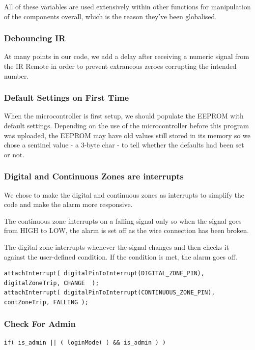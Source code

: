 \documentclass[a4paper,11pt]{article}
\theoremstyle{mytheor}
\begin{document}
All of these variables are used extensively within other functions for manipulation of the components overall, which is the reason they've been globalised.

\subsubsection{Debouncing IR}

At many points in our code, we add a delay after receiving a numeric signal from the IR Remote in order to prevent extraneous zeroes corrupting the intended number.

\subsubsection{Default Settings on First Time}

When the microcontroller is first setup, we should populate the EEPROM with default settings. Depending on the use of the microcontroller before this program was uploaded, the EEPROM may have old values still stored in its memory so we chose a sentinel value - a 3-byte char - to tell whether the defaults had been set or not. 

\subsubsection{Digital and Continuous Zones are interrupts}

We chose to make the digital and continuous zones as interrupts to simplify the code and make the alarm more responsive.

The continuous zone interrupts on a falling signal only so when the signal goes from HIGH to LOW, the alarm is set off as the wire connection has been broken.

The digital zone interrupts whenever the signal changes and then checks it against the user-defined condition. If the condition is met, the alarm goes off.

\begin{lstlisting}
attachInterrupt( digitalPinToInterrupt(DIGITAL_ZONE_PIN), digitalZoneTrip, CHANGE  );
attachInterrupt( digitalPinToInterrupt(CONTINUOUS_ZONE_PIN), contZoneTrip, FALLING );
\end{lstlisting}

\subsubsection{Check For Admin}
\begin{lstlisting}
if( is_admin || ( loginMode( ) && is_admin ) )
\end{lstlisting}
\end{document}
